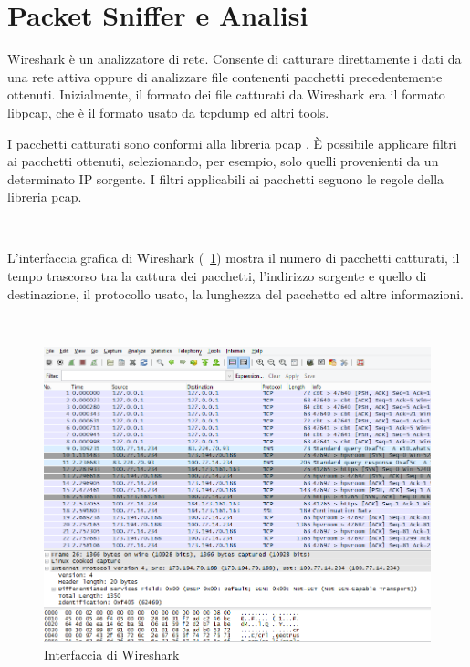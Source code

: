 \documentclass[a4paper,11pt]{book}
\begin{document}
\clearpage

\section{Packet Sniffer e Analisi}

Wireshark \cite{rif5} \`e un analizzatore di rete. Consente di catturare direttamente i dati da una rete attiva oppure di analizzare file contenenti pacchetti precedentemente ottenuti. Inizialmente, il formato dei file catturati da Wireshark era il formato libpcap, che \`e il formato usato da tcpdump ed altri tools.

I pacchetti catturati sono conformi alla libreria pcap \cite{rif6}. \`E possibile applicare filtri ai pacchetti ottenuti, selezionando, per esempio, solo quelli provenienti da un determinato IP sorgente. I filtri applicabili ai pacchetti seguono le regole della libreria pcap.

~

L'interfaccia grafica di Wireshark (\figurename ~\ref{fig:Whireshark}) mostra il numero di pacchetti catturati, il tempo trascorso tra la cattura dei pacchetti, l'indirizzo sorgente e quello di destinazione, il protocollo usato, la lunghezza del pacchetto ed altre informazioni.

~

\begin{figure}[!ht]
\centering
\includegraphics[scale = 0.6]{Whireshark}
\caption{Interfaccia di Wireshark}
\label{fig:Whireshark}
\end{figure}

\clearpage
\end{document}
